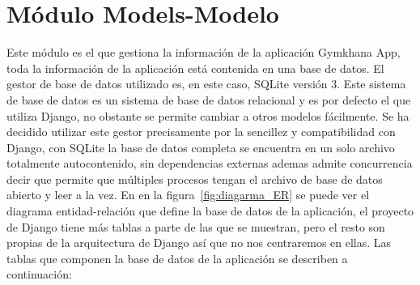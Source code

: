 \documentclass[a4paper, 12pt]{book}
\begin{document}
\section{Módulo Models-Modelo}
Este módulo es el que gestiona la información de la aplicación Gymkhana App, toda la información de la aplicación está contenida en una base de datos. El gestor de base de datos utilizado es, en este caso, SQLite versión 3. Este sistema de base de datos es un sistema de base de datos relacional y es por defecto el que utiliza Django, no obstante se permite cambiar a otros modelos fácilmente. Se ha decidido utilizar este gestor precisamente por la sencillez y compatibilidad con Django, con SQLite la base de datos completa se encuentra en un solo archivo totalmente autocontenido, sin dependencias externas ademas admite concurrencia decir que permite que múltiples procesos tengan el archivo de base de datos abierto y leer a la vez. En  en la figura~\ref{fig:diagarma_ER} se puede ver el diagrama entidad-relación que define la base de datos de la aplicación, el proyecto de Django tiene más tablas a parte de las que se muestran, pero el resto son propias de la arquitectura de Django así que no nos centraremos en ellas. Las tablas que componen la base de datos de la aplicación se describen a continuación:
\end{document}
